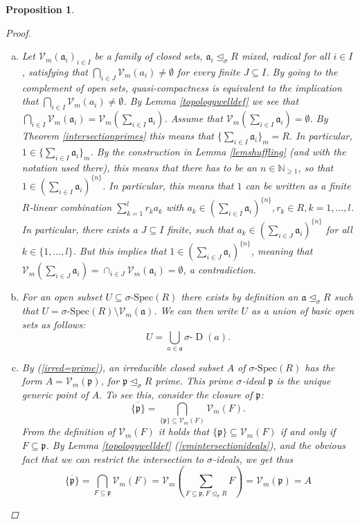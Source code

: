 \documentclass{article}
\def\NE{\mathbb{N}_{\geq1}}
\def\Vm{\mathcal{V}_m}
\def\V{\mathcal{V}}
\def\a{\mathfrak{a}}
\def\p{\mathfrak{p}}
\def\s{\sigma}
\def\si{\unlhd_{\sigma}}
\def\sD{\s\text{-}\operatorname{D}}
\def\sSpec{\sigma\text{-Spec}}
\newenvironment{bew}{\begin{proof}[Proof]}{\end{proof}}
\theoremstyle{plain}
\newtheorem{prop}[Satz]{Proposition}
\theoremstyle{definition}
\begin{document}
\begin{prop}
\begin{bew}
\begin{enumerate}[(a)]
Now, by assumption, $\Vm(F)$ is irreducible, and thus it has to be that $\Vm(F) \subseteq \Vm(\{a\}_{m})$ or $\Vm(F) \subseteq \Vm(\{b\}_m)$. By the bijectivity of the mapping in (\ref{orderreversingbij}) this means that $a \in F$ or $b \in F$.
\item Let $\Vm(\a_i)_{i \in I}$ be a family of closed sets, $\a_i \si R$ mixed, radical for all $i \in I$, satisfying that 
$\bigcap_{i \in J} \Vm( a_i) \neq \emptyset$ for every finite $J \subseteq I$. By  going to the complement of open sets, quasi-compactness is equivalent to the implication that $\bigcap_{i \in I} \Vm(a_i) \neq \emptyset$.
By Lemma \ref{topologywelldef} we see that $\bigcap_{i \in I} \Vm( \a_i) = \Vm ( \sum_{i \in I} \a_i)$. Assume that $ \Vm ( \sum_{i \in I} \a_i) = \emptyset$. 
By Theorem \ref{intersectionprimes} this means that $\{ \sum_{i \in I} \a_i \}_m = R$. In particular, $1 \in \{ \sum_{i \in I} \a_i \}_m$. By the construction in Lemma \ref{lemshuffling} (and with the notation used there), this means that there has to be an $n \in \NE$,
so that $1 \in (\sum_{i \in I} \a_i )^{\{n\}}$. In particular, this means that $1$ can be written as a finite $R$-linear combination $\sum_{k=1}^l r_k a_k$ with $a_k \in (\sum_{i \in I} \a_i )^{\{n\}}, r_k \in R, k = 1,\ldots,l$. In particular, there exists a $J \subseteq I$ finite,
such that $a_k \in (\sum_{i \in J} \a_i )^{\{n\}}$ for all $k \in \{1, \ldots, l \}$. But this implies that $1 \in (\sum_{i \in J} \a_i)^{\{n\}}$, meaning that $\Vm(\sum_{i \in J} \a_i) = \cap_{i \in J} \Vm(\a_i) = \emptyset$, a contradiction. 
\item For an open subset $U \subseteq \sSpec(R)$ there exists by definition an $\a \si R$ such that $U = \sSpec(R) \setminus \Vm(\a)$. We can then write $U$ as a union of basic open sets as follows: $$U = \bigcup_{a \in \a} \sD(a).$$
\item By (\ref{irred=prime}), an irreducible closed subset $A$ of $\sSpec(R)$ has the form $A = \Vm(\p)$, for $\p \si R$ prime. This prime $\s$-ideal $\p$ is the unique generic point of $A$.
To see this, consider the closure of $\p$: $$\overline{\{\p\}} = \bigcap_{\{\p\} \subseteq \Vm(F)}\Vm(F).$$ From the definition of $\Vm(F)$ it holds that $\{\p\} \subseteq \V_m(F)$ if and only if $F \subseteq \p$. By Lemma \ref{topologywelldef} (\ref{vmintersectionideals}), and the obvious fact that we can restrict the intersection to $\s$-ideals, we get thus
\[ \overline{\{\p\}} = \bigcap_{F \subseteq \p}\Vm(F) = \Vm(\sum_{F \subseteq \p, F \si R} F) = \Vm(\p) = A \]
\end{enumerate}
\end{bew}
\end{prop}
\end{document}
